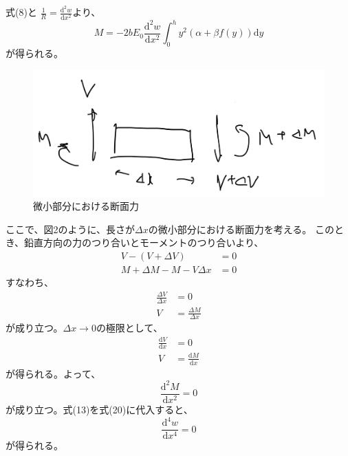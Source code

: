 \documentclass[a4paper]{jsarticle}
\begin{document}
\subsection{}
式(8)と
$\frac{1}{R} = \frac{\mathrm{d}^2 w}{\mathrm{d} x^2}$より、
\begin{equation}
  M = -2 b E_0 \frac{\mathrm{d}^2 w}{\mathrm{d} x^2} \int_0^h y^2 (\alpha + \beta f(y)) \mathrm{d} y
\end{equation}
が得られる。
\begin{figure}[htb]
  \centering
  \includegraphics[width=0.3\hsize]{fig2.png}
  \caption{微小部分における断面力}
\end{figure}
ここで、図2のように、長さが$\varDelta x$の微小部分における断面力を考える。
このとき、鉛直方向の力のつり合いとモーメントのつり合いより、
\begin{align}
  V - (V + \varDelta V) &= 0 \\
  M + \varDelta M - M - V \varDelta x &= 0
\end{align}
すなわち、
\begin{align}
  \frac{\varDelta V}{\varDelta x} &= 0 \\
  V &= \frac{\varDelta M}{\varDelta x}
\end{align}
が成り立つ。$\varDelta x \to 0$の極限として、
\begin{align}
  \frac{\mathrm{d} V}{\mathrm{d} x} &= 0 \\
  V &= \frac{\mathrm{d} M}{\mathrm{d} x}
\end{align}
が得られる。よって、
\begin{equation}
  \frac{\mathrm{d}^2 M}{\mathrm{d} x^2} = 0
\end{equation}
が成り立つ。式(13)を式(20)に代入すると、
\begin{equation}
  \frac{\mathrm{d}^4 w}{\mathrm{d} x^4} = 0
\end{equation}
が得られる。
\end{document}
